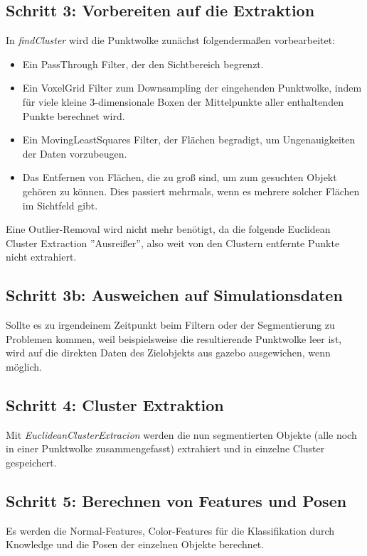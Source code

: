 \documentclass{suturo}
\begin{document}
\subsection*{Schritt 3: Vorbereiten auf die Extraktion} 
In \textit{findCluster} wird die Punktwolke zunächst folgendermaßen vorbearbeitet:

\begin{itemize} 
\item Ein PassThrough Filter, der den Sichtbereich begrenzt.
\item Ein VoxelGrid Filter zum Downsampling der eingehenden Punktwolke, indem für viele kleine 3-dimensionale Boxen der Mittelpunkte aller enthaltenden Punkte berechnet wird.
\item Ein MovingLeastSquares Filter, der Flächen begradigt, um Ungenauigkeiten der Daten vorzubeugen.
\item Das Entfernen von Flächen, die zu groß sind, um zum gesuchten Objekt gehören zu können. Dies passiert mehrmals, wenn es mehrere solcher Flächen im Sichtfeld gibt.
\end{itemize}
Eine Outlier-Removal wird nicht mehr benötigt, da die folgende Euclidean Cluster Extraction ''Ausreißer'', also weit von den Clustern entfernte Punkte nicht extrahiert.\\
\subsection*{Schritt 3b: Ausweichen auf Simulationsdaten}
Sollte es zu irgendeinem Zeitpunkt beim Filtern oder der Segmentierung zu Problemen kommen, weil beispielsweise die resultierende Punktwolke leer ist, wird auf die direkten Daten des Zielobjekts aus gazebo ausgewichen, wenn möglich.
\\
\subsection*{Schritt 4: Cluster Extraktion}
Mit \textit{EuclideanClusterExtracion} werden die nun segmentierten Objekte (alle noch in einer Punktwolke zusammengefasst) extrahiert und in einzelne Cluster gespeichert.
\\
\subsection*{Schritt 5: Berechnen von Features und Posen}
Es werden die Normal-Features, Color-Features für die Klassifikation durch Knowledge und die Posen der einzelnen Objekte berechnet.
 
\end{document}
